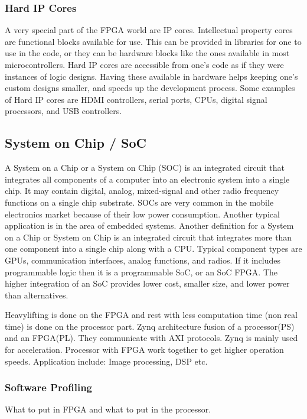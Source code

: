 \subsubsection{Hard IP Cores}
A very special part of the FPGA world are IP cores. Intellectual property cores are functional blocks available for use. This can be provided in libraries for one to use in the code, or they can be hardware blocks like the ones available in most microcontrollers. Hard IP cores are accessible from one's code as if they were instances of logic designs. Having these available in hardware helps keeping one's custom designs smaller, and speeds up the development process. Some examples of Hard IP cores are HDMI controllers, serial ports, CPUs, digital signal processors, and USB controllers.

\subsection{System on Chip / SoC}
A System on a Chip or a System on Chip (SOC) is an integrated circuit that integrates all components of a computer into an electronic system into a single chip. It may contain digital, analog, mixed-signal and other radio frequency functions on a single chip substrate. SOCs are very common in the mobile electronics market because of their low power consumption. Another typical application is in the area of embedded systems. Another definition for a System on a Chip or System on Chip is an integrated circuit that integrates more than one component into a single chip along with a CPU. Typical component types are GPUs, communication interfaces, analog functions, and radios. If it includes programmable logic then it is a programmable SoC, or an SoC FPGA. The higher integration of an SoC provides lower cost, smaller size, and lower power than alternatives. 

Heavylifting is done on the FPGA and rest with less computation time (non real time) is done on the processor part. Zynq architecture fusion of a processor(PS) and an FPGA(PL). They communicate with AXI protocols. Zynq is mainly used for acceleration. Processor with FPGA work together to get higher operation speeds. Application include: Image processing, DSP etc. 

\subsubsection{Software Profiling} What to put in FPGA and what to put in the processor.

\pagebreak
   
\pagebreak
   
\pagebreak

